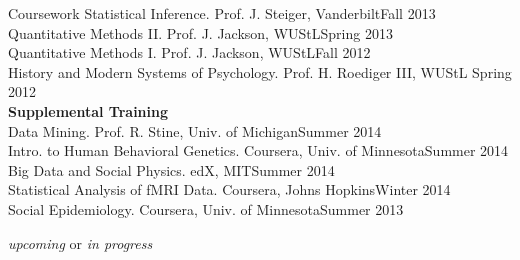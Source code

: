 \documentclass {resume}
\begin{document}
\begin{rSection}{\textrm{Coursework}}
Statistical Inference. Prof. J. Steiger, Vanderbilt\hfill  {Fall 2013}\smallskip\\
Quantitative Methods \textrm{II}. Prof. J. Jackson, WUStL\hfill  {Spring 2013}\smallskip\\
Quantitative Methods \textrm{I}. Prof. J. Jackson, WUStL\hfill  {Fall 2012}\smallskip\\
History and Modern Systems of Psychology. Prof. H. Roediger \textrm{III}, WUStL \hfill  {Spring 2012}\medskip\\
{\large \textbf{Supplemental Training}}\\
Data Mining. Prof. R. Stine, Univ. of Michigan\hfill  {Summer 2014}\smallskip\\
Intro. to Human Behavioral Genetics. Coursera, Univ. of Minnesota\hfill{Summer 2014}%
\smallskip\\
Big Data and Social Physics. edX, MIT\hfill{Summer 2014}%
\smallskip\\
Statistical Analysis of fMRI Data. Coursera, Johns Hopkins\hfill{Winter 2014}%
\smallskip\\
Social Epidemiology. Coursera, Univ. of Minnesota\hfill{Summer 2013}%
\vspace{-2mm}\begin{center}\footnotesize{ \textit{upcoming} or \textit{in progress}
}\end{center} \vspace{-4mm}
\end{rSection}

\end{document}

